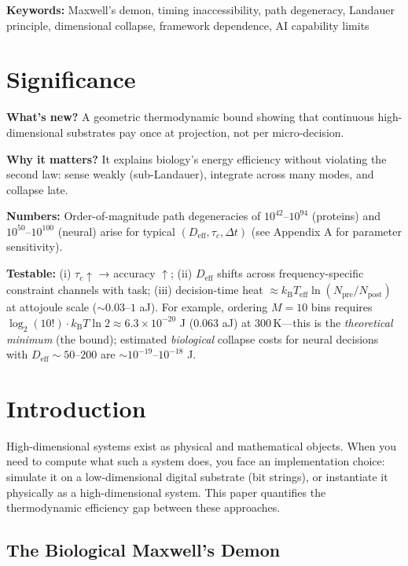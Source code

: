 \documentclass[12pt]{article}
\numberwithin{equation}{section}
\newcommand{\kB}{k_{\mathrm{B}}}
\newcommand{\Teff}{T_{\mathrm{eff}}}
\begin{document}
\textbf{Keywords:} Maxwell's demon, timing inaccessibility, path degeneracy, Landauer principle, dimensional collapse, framework dependence, AI capability limits

\section*{Significance}

\textbf{What's new?} A geometric thermodynamic bound showing that continuous high-dimensional substrates pay once at projection, not per micro-decision.

\textbf{Why it matters?} It explains biology's energy efficiency without violating the second law: sense weakly (sub-Landauer), integrate across many modes, and collapse late.

\textbf{Numbers:} Order-of-magnitude path degeneracies of $10^{42}$--$10^{94}$ (proteins) and $10^{50}$--$10^{100}$ (neural) arise for typical $(D_{\mathrm{eff}}, \tau_c, \Delta t)$ (see Appendix A for parameter sensitivity).

\textbf{Testable:} (i) $\tau_c \uparrow$ → accuracy $\uparrow$; (ii) $D_{\mathrm{eff}}$ shifts across frequency-specific constraint channels with task; (iii) decision-time heat $\approx \kB\Teff\ln(N_{\mathrm{pre}}/N_{\mathrm{post}})$ at attojoule scale ($\sim 0.03$--$1$ aJ). For example, ordering $M{=}10$ bins requires $\log_2(10!) \cdot \kB T\ln 2 \approx 6.3\times10^{-20}$ J ($0.063$ aJ) at 300\,K---this is the \emph{theoretical minimum} (the bound); estimated \emph{biological} collapse costs for neural decisions with $D_{\mathrm{eff}} \sim 50$--$200$ are $\sim 10^{-19}$--$10^{-18}$ J.

\section{Introduction}

High-dimensional systems exist as physical and mathematical objects. When you need to compute what such a system does, you face an implementation choice: simulate it on a low-dimensional digital substrate (bit strings), or instantiate it physically as a high-dimensional system. This paper quantifies the thermodynamic efficiency gap between these approaches.

\subsection{The Biological Maxwell's Demon}
\end{document}
